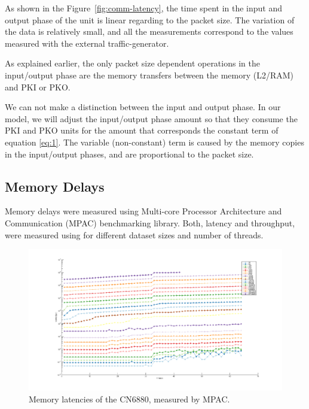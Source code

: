 As shown in the Figure~\ref{fig:comm-latency}, the time spent in the input and output phase of the unit is linear regarding to the packet size. The variation of the data is relatively small, and all the measurements correspond to the values measured with the external traffic-generator.


As explained earlier, the only packet size dependent operations in the input/output phase are the  memory transfers between the memory (L2/RAM) and PKI or PKO.

We can not make a distinction between the input and output phase.
In our model, we will adjust the input/output phase amount so that they consume the PKI and PKO units for the amount that corresponds the constant term of equation \ref{eq:1}. The variable (non-constant) term is caused by the memory copies in the input/output phases, and are proportional to the packet size.

\subsection{Memory Delays}
\label{sec:memory-delays}

Memory delays were measured using Multi-core Processor Architecture and Communication (MPAC) benchmarking library. \cite{cite} Both, latency and throughput, were measured using for different dataset sizes and number of threads.

\begin{figure}[]
  \begin{center}
    \includegraphics[width=\textwidth]{images/mem-latency.pdf}
    \caption{Memory latencies of the CN6880, measured by MPAC.}
    \label{fig:mem-latency}
  \end{center}
\end{figure}

